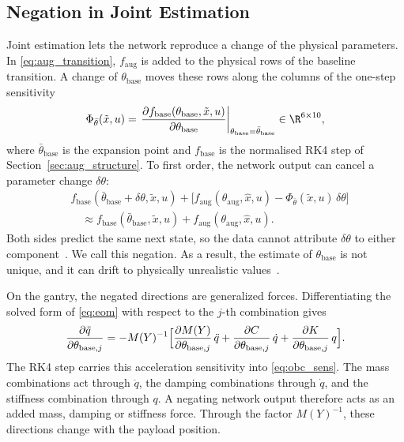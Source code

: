 \subsection{Negation in Joint Estimation}\label{sec:obc_negation}
Joint estimation lets the network reproduce a change of the physical
parameters.
In \eqref{eq:aug_transition}, $f_{\mathrm{aug}}$ is added to the physical rows
of the baseline transition.
A change of $\theta_{\mathrm{base}}$ moves these rows along the columns of the
one-step sensitivity~\cite[Eq.~(15)]{gyorok2025l4dc}
\begin{equation}
 \Phi_{\bar\theta}(\tilde x,u)
 =\left.\frac{\partial f_{\mathrm{base}}(\theta_{\mathrm{base}},\tilde x,u)}
   {\partial\theta_{\mathrm{base}}}\right|_{\theta_{\mathrm{base}}=\bar\theta_{\mathrm{base}}}
   \in\R^{6\times10},
\label{eq:obc_sens}
\end{equation}
where $\bar\theta_{\mathrm{base}}$ is the expansion point and
$f_{\mathrm{base}}$ is the normalised RK4 step of
Section~\ref{sec:aug_structure}.
To first order, the network output can cancel a parameter change
$\delta\theta$:
\begin{equation}
\begin{aligned}
 &f_{\mathrm{base}}(\bar\theta_{\mathrm{base}}+\delta\theta,\tilde x,u)
 +\bigl[f_{\mathrm{aug}}(\theta_{\mathrm{aug}},\hat x,u)
 -\Phi_{\bar\theta}(\tilde x,u)\,\delta\theta\bigr]\\
 &\quad\approx f_{\mathrm{base}}(\bar\theta_{\mathrm{base}},\tilde x,u)
 +f_{\mathrm{aug}}(\theta_{\mathrm{aug}},\hat x,u).
\end{aligned}
\label{eq:obc_negation}
\end{equation}
Both sides predict the same next state, so the data cannot attribute
$\delta\theta$ to either component~\cite[Ex.~2]{gyorok2026obc}.
We call this negation.
As a result, the estimate of $\theta_{\mathrm{base}}$ is not unique, and it
can drift to physically unrealistic values~\cite[Sec.~3.1]{gyorok2026obc}.

On the gantry, the negated directions are generalized forces.
Differentiating the solved form of \eqref{eq:eom} with respect to the $j$-th
combination gives
\begin{equation}
 \frac{\partial\ddot q}{\partial\theta_{\mathrm{base},j}}
 =-M(Y)^{-1}\Bigl[\frac{\partial M(Y)}{\partial\theta_{\mathrm{base},j}}\,\ddot q
 +\frac{\partial C}{\partial\theta_{\mathrm{base},j}}\,\dot q
 +\frac{\partial K}{\partial\theta_{\mathrm{base},j}}\,q\Bigr].
\label{eq:obc_gantry_sens}
\end{equation}
The RK4 step carries this acceleration sensitivity into
\eqref{eq:obc_sens}.
The mass combinations act through $\ddot q$, the damping combinations through
$\dot q$, and the stiffness combination through $q$.
A negating network output therefore acts as an added mass, damping or stiffness force.
Through the factor $M(Y)^{-1}$, these directions change with the payload
position.

